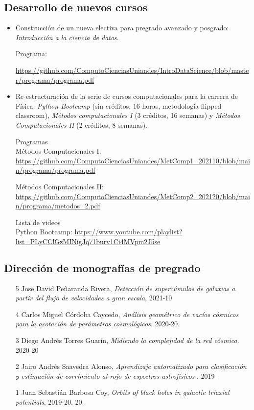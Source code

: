\documentclass{article}
\begin{document}
\subsection{Desarrollo de nuevos cursos}
\begin{itemize}
\item Construcci\'on de un nueva electiva para pregrado avanzado y posgrado: \emph{Introducci\'on a la ciencia de datos}. 

Programa:

\url{https://github.com/ComputoCienciasUniandes/IntroDataScience/blob/master/programa/programa.pdf}

\item Re-estructuraci\'on de la serie de cursos computacionales para la carrera de F\'isica: \emph{Python Bootcamp} (sin cr\'editos, 16 horas, metodolog\'ia flipped classroom), \emph{M\'etodos computacionales I } (3 cr\'editos, 16 semanas) y \emph{M\'etodos Computacionales II} (2 cr\'editos, 8 semanas).

Programas\\

M\'etodos Computacionales I: \url{https://github.com/ComputoCienciasUniandes/MetComp1_202110/blob/main/programa/programa.pdf}

M\'etodos Computacionales II:
\url{https://github.com/ComputoCienciasUniandes/MetComp2_202120/blob/main/programa/metodos_2.pdf}

Lista de videos\\

Python Bootcamp: 
\url{https://www.youtube.com/playlist?list=PLyCClGzMINigJq71burv1Ci4MVpm2J5se} 


\end{itemize}


\subsection{Direcci\'on de monograf\'ias de pregrado}

\begin{itemize}
\item [5] Jose David Pe\~naranda Rivera, \emph{Detección de supercúmulos de galaxias a partir del flujo de velocidades a gran escala},
  2021-10
 \item [4] Carlos Miguel C\'ordoba Caycedo, \emph{Análisis geométrico de vacíos cósmicos para la acotación de parámetros cosmológicos}. 2020-20. 

\item [3] Diego Andr\'es Torres Guar\'in, \emph{Midiendo la complejidad de la red cósmica}. 2020-20
\item [2] Jairo Andr\'es Saavedra Alonso, \emph{Aprendizaje automatizado para clasificación y estimación de corrimiento al rojo de espectros astrofísicos
}. 2019-
\item [1] Juan Sebasti\'an Barbosa Coy, \emph{Orbits of black holes in galactic triaxial potentials}, 2019-20.  
20.  


\end{itemize}
\end{document}
